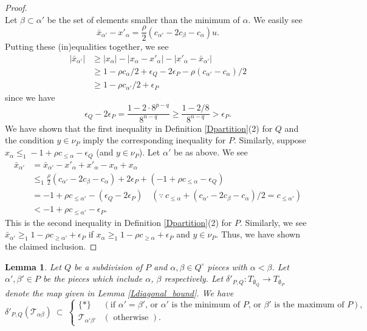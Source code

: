 \documentclass[reqno]{amsart}
\theoremstyle{definition}
\theoremstyle{plain}
\newtheorem{lem}[defi]{Lemma}
\newcommand{\eps}{\epsilon}
\newcommand{\TT}{\mathcal{T}} %
\begin{document}
\begin{proof}
\begin{equation}
\end{equation}
Let $\beta\subset \alpha'$ be the  set of elements smaller than the minimum of $\alpha$. We easily see 
\begin{equation}
\bar x_{\alpha'}-x'_\alpha=\frac{\rho}{2}(c_{\alpha'}-2c_\beta-c_\alpha)u. \label{Earrange}
\end{equation}
Putting these (in)equalities together, we see
\[
\begin{split}
|\bar x_{\alpha'}|& \geq |x_\alpha|-|x_\alpha-x'_\alpha|-|x'_\alpha-\bar x_{\alpha'}| \\
& \geq 1-\rho c_\alpha/2+\eps_Q-2\eps_P-\rho(c_{\alpha'}-c_\alpha)/2 \\
& \geq 1-\rho c_{\alpha'}/2+\eps_P
\end{split}
\]
since we have 
\[
\eps_Q-2\eps_P=\frac{1-2\cdot 8^{p-q}}{8^{n-q}}\geq \frac{1-2/8}{8^{n-q}}>\eps_P.
\]
We have shown that the first inequality in Definition \ref{Dpartition}(2) for $Q$ and the condition $y\in \nu_P$ imply the corresponding inequality for $P$. 
Similarly, suppose $x_\alpha\leq_1 -1+\rho c_{\leq \alpha}-\eps_Q$ (and $y\in \nu_P$). Let $\alpha'$ be  as above.
We see 
\[
\begin{split}
\bar x_{\alpha'} & =\bar x_{\alpha'}-x'_\alpha+x'_\alpha-x_\alpha+x_\alpha \\
& \leq_1 \frac{\rho}{2}(c_{\alpha'}-2c_\beta-c_\alpha)+2\eps_P+(-1+\rho c_{\leq \alpha}-\eps_Q) \\
&=-1+\rho c_{\leq \alpha'}-(\eps_Q-2\eps_P)  \quad (\because \ c_{\leq \alpha}+(c_{\alpha'}-2c_\beta-c_\alpha)/2=c_{\leq \alpha'}) \\
&<-1+\rho c_{\leq \alpha'}-\eps_P.
\end{split}
\]
This is  the second inequality in Definition \ref{Dpartition}(2) for $P$. 
Similarly, we see $\bar x_{\alpha'}\geq_1 1-\rho c_{\geq \alpha'}+\eps_P$ if $ x_{\alpha}\geq_1 1-\rho c_{\geq \alpha}+\eps_P$ and $y\in \nu_P$. Thus, we have shown the claimed inclusion.
\end{proof}
\begin{lem}\label{Ldiagonal_incl}
Let $Q$ be a subdivision of $P$ and $\alpha, \beta \in Q^\circ $ pieces with $\alpha<\beta$.  Let $\alpha', \beta' \in P$ be the pieces which include $\alpha$, $\beta$ respectively. Let $\delta'_{P,Q}:T_{\emptyset_Q}\to T_{\emptyset_P}$ denote the map given in Lemma \ref{Ldiagonal_bound}.
We have 
\[
\delta'_{P,Q}(\TT_{\alpha \beta})\ \subset \
\left\{
\begin{array}{cc}
\{*\} & (\text{if $\alpha'=\beta'$, or $\alpha'$ is the minimum of $P$, or $\beta'$ is the maximum of $P$}), \\
\TT_{\alpha' \beta'} & (\text{ otherwise }).
\end{array}
\right.
\] 

\end{lem}
\end{document}
